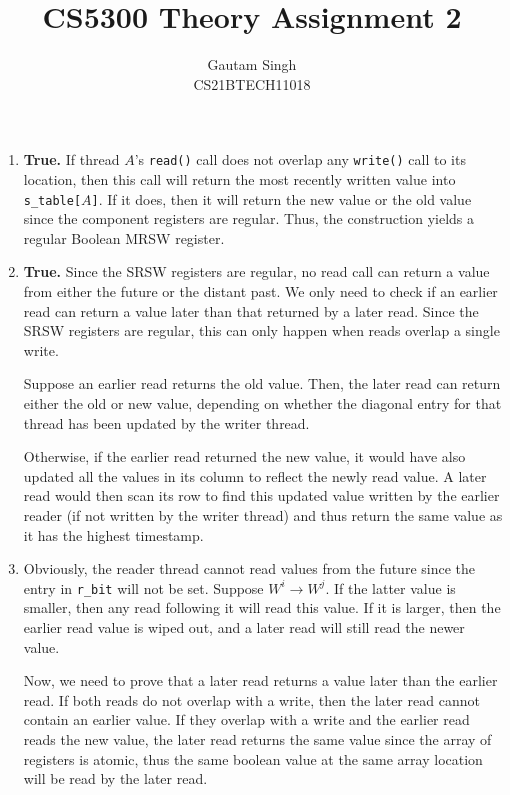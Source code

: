 \documentclass[conference,compsoc]{IEEEtran}
\begin{document}
\vspace{3cm}
\title{CS5300 Theory Assignment 2}
\author{Gautam Singh\\CS21BTECH11018}
\maketitle

\bigskip

\begin{enumerate}
    \item \textbf{True.} If thread \(A\)'s \texttt{read()} call does not overlap
    any \texttt{write()} call to its location, then this call will return the
    most recently written value into \texttt{s\_table[\(A\)]}. If it does, then
    it will return the new value or the old value since the component registers
    are regular. Thus, the construction yields a regular Boolean MRSW register.

    \item \textbf{True.} Since the SRSW registers are regular, no read call can
    return a value from either the future or the distant past. We only need to
    check if an earlier read can return a value later than that returned by a
    later read. Since the SRSW registers are regular, this can only happen when
    reads overlap a single write.
    
    Suppose an earlier read returns the old value. Then, the later read can
    return either the old or new value, depending on whether the diagonal entry
    for that thread has been updated by the writer thread. 
    
    Otherwise, if the earlier read returned the new value, it would have also
    updated all the values in its column to reflect the newly read value. A
    later read would then scan its row to find this updated value written by the
    earlier reader (if not written by the writer thread) and thus return the
    same value as it has the highest timestamp.

    \item Obviously, the reader thread cannot read values from the future since
    the entry in \texttt{r\_bit} will not be set. Suppose \(W^i \rightarrow
    W^j\). If the latter value is smaller, then any read following it will read
    this value. If it is larger, then the earlier read value is wiped out, and a
    later read will still read the newer value.
    
    Now, we need to prove that a later read returns a value later than the
    earlier read. If both reads do not overlap with a write, then the later read
    cannot contain an earlier value. If they overlap with a write and the
    earlier read reads the new value, the later read returns the same value
    since the array of registers is atomic, thus the same boolean value at the
    same array location will be read by the later read. 


\end{enumerate}
\end{document}

